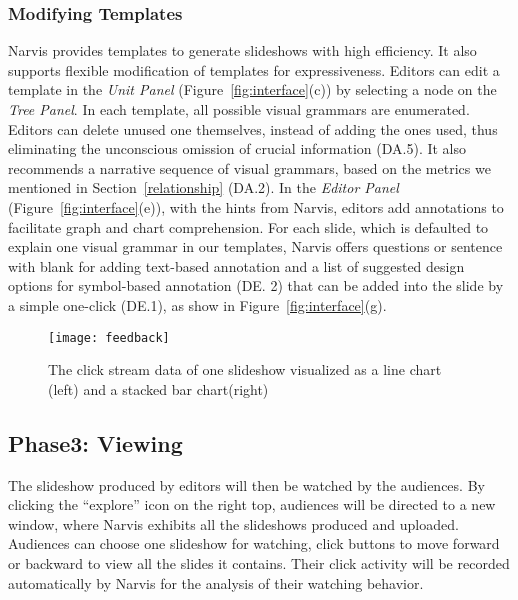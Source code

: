\subsubsection{Modifying Templates} 
Narvis provides templates to generate slideshows with high efficiency. 
It also supports flexible modification of templates for expressiveness.
Editors can edit a template in the \textit{Unit Panel} (Figure~\ref{fig:interface}(c)) by selecting a node on the \textit{Tree Panel}. In each template, all possible visual grammars are enumerated. Editors can delete unused one themselves, instead of adding the ones used, thus eliminating the unconscious omission of crucial information (DA.5).
It also recommends a narrative sequence of visual grammars, based on the metrics we mentioned in Section~\ref{relationship} (DA.2). 
In the \textit{Editor Panel} (Figure~\ref{fig:interface}(e)), with the hints from Narvis, editors add annotations to facilitate graph and chart comprehension. For each slide, which is defaulted to explain one visual grammar in our templates, Narvis offers questions or sentence with blank for adding text-based annotation and a list of suggested design options for symbol-based annotation (DE. 2) that can be added into the slide by a simple one-click (DE.1), as show in Figure~\ref{fig:interface}(g).



\begin{figure}
 \centering 
 \texttt{[image: feedback]}
 \caption{The click stream data of one slideshow visualized as a line chart (left) and a stacked bar chart(right)}
 \label{fig:feedback}
\end{figure}


\subsection{Phase3: Viewing}
The slideshow produced by editors will then be watched by the audiences. By clicking the ``explore'' icon on the right top, audiences will be directed to a new window, where Narvis exhibits all the slideshows produced and uploaded.
Audiences can choose one slideshow for watching, click buttons to move forward or backward to view all the slides it contains. Their click activity will be recorded automatically by Narvis for the analysis of their watching behavior. 

